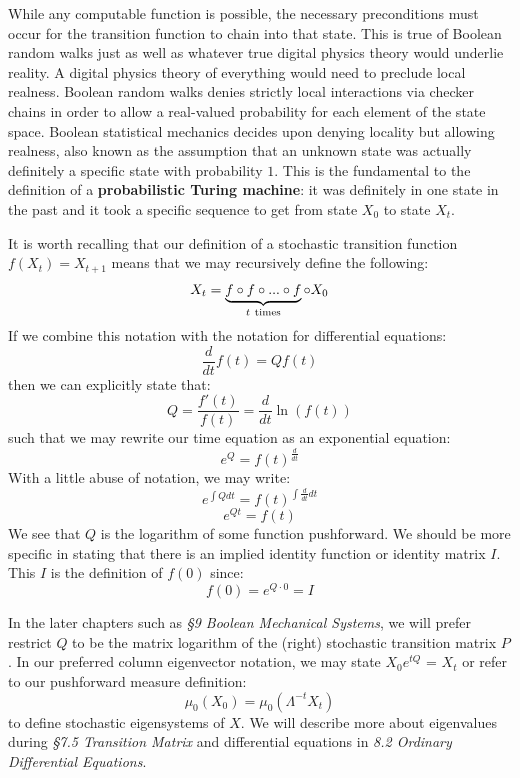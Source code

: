 \documentclass[10pt, a5paper, twoside, openright]{memoir}
\begin{document}
While any computable function is possible, the necessary preconditions must occur for the transition function to chain into that state. This is true of Boolean random walks just as well as whatever true digital physics theory would underlie reality. A digital physics theory of everything would need to preclude local realness. Boolean random walks denies strictly local interactions via checker chains in order to allow a real-valued probability for each element of the state space. Boolean statistical mechanics decides upon denying locality but allowing realness, also known as the assumption that an unknown state was actually definitely a specific state with probability $1$. This is the fundamental to the definition of a \textbf{probabilistic Turing machine}: it was definitely in one state in the past and it took a specific sequence to get from state $X_0$ to state $X_t$.

It is worth recalling that our definition of a stochastic transition function $f(X_t) = X_{t+1}$ means that we may recursively define the following:
$$X_t = \underbrace{f \circ f \circ ... \circ f}_{t \ \textnormal{times}} \circ X_0$$
If we combine this notation with the notation for differential equations:
$$\frac{d}{dt}f(t) = Q f(t)$$
then we can explicitly state that:
$$Q = \frac{f'(t)}{f(t)} = \frac{d}{dt}\ln (f(t))$$
such that we may rewrite our time equation as an exponential equation:
$$e^{Q} = f(t)^{\frac{d}{dt}}$$
With a little abuse of notation, we may write:
$$e^{\int Q dt} = f(t)^{\int\frac{d}{dt}dt} $$
$$e^{Q t} = f(t)$$
We see that $Q$ is the logarithm of some function pushforward. We should be more specific in stating that there is an implied identity function or identity matrix $I$. This $I$ is the definition of $f(0)$ since:
$$f(0) = e^{Q \cdot 0} = I$$

In the later chapters such as \textit{\S 9 Boolean Mechanical Systems}, we will prefer restrict $Q$ to be the matrix logarithm of the (right) stochastic transition matrix $P$. In our preferred column eigenvector notation, we may state $X_0 e^{tQ}$ = $X_t$ or refer to our pushforward measure definition:
$$\mu_0(X_0) = \mu_0(\Lambda^{-t}X_t)$$
to define stochastic eigensystems of $X$. We will describe more about eigenvalues during \textit{\S 7.5 Transition Matrix} and differential equations in \textit{8.2 Ordinary Differential Equations}.
\end{document}

